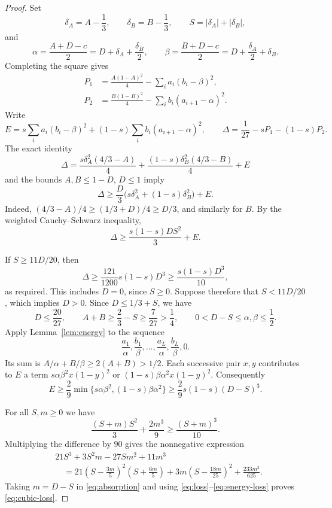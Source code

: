 \documentclass[11pt]{article}
\numberwithin{equation}{section}
\begin{document}
\begin{proof}
Set
\[
 \delta_A=A-\frac13,\qquad\delta_B=B-\frac13,
 \qquad S=|\delta_A|+|\delta_B|,
\]
and
\[
 \alpha=\frac{A+D-c}{2}=D+\delta_A+\frac{\delta_B}{2},
 \qquad
 \beta=\frac{B+D-c}{2}=D+\frac{\delta_A}{2}+\delta_B.
\]
Completing the square gives
\begin{align}
 P_1&=\frac{A(1-A)^2}{4}-\sum_i a_i(b_i-\beta)^2,
 \label{eq:square1}\\
 P_2&=\frac{B(1-B)^2}{4}-\sum_i b_i(a_{i+1}-\alpha)^2.
 \label{eq:square2}
\end{align}
Write
\[
 E=s\sum_i a_i(b_i-\beta)^2
 +(1-s)\sum_i b_i(a_{i+1}-\alpha)^2,
 \qquad
 \Delta=\frac1{27}-sP_1-(1-s)P_2.
\]
The exact identity
\[
 \Delta=\frac{s\delta_A^2(4/3-A)}4
 +\frac{(1-s)\delta_B^2(4/3-B)}4+E
\]
and the bounds \(A,B\le1-D\), \(D\le1\) imply
\[
 \Delta\ge\frac D3\bigl(s\delta_A^2+(1-s)\delta_B^2\bigr)+E.
\]
Indeed, \((4/3-A)/4\ge(1/3+D)/4\ge D/3\), and similarly for
\(B\). By the weighted Cauchy--Schwarz inequality,
\begin{equation}\label{eq:loss}
 \Delta\ge\frac{s(1-s)DS^2}{3}+E.
\end{equation}

If \(S\ge11D/20\), then
\[
 \Delta\ge\frac{121}{1200}s(1-s)D^3
 \ge\frac{s(1-s)D^3}{10},
\]
as required. This includes \(D=0\), since \(S\ge0\).
Suppose therefore that \(S<11D/20\), which implies \(D>0\). Since
\(D\le1/3+S\), we have
\[
 D\le\frac{20}{27},\qquad
 A+B\ge\frac23-S\ge\frac7{27}>\frac14,
 \qquad 0<D-S\le\alpha,\beta\le\frac12.
\]
Apply Lemma~\ref{lem:energy} to the sequence
\[
 \frac{a_1}{\alpha},\frac{b_1}{\beta},\ldots,
 \frac{a_L}{\alpha},\frac{b_L}{\beta},0.
\]
Its sum is \(A/\alpha+B/\beta\ge2(A+B)>1/2\).
Each successive pair \(x,y\) contributes to \(E\) a term
\(s\alpha\beta^2x(1-y)^2\) or
\((1-s)\beta\alpha^2x(1-y)^2\). Consequently
\begin{equation}\label{eq:energy-loss}
 E\ge\frac29\min\{s\alpha\beta^2,(1-s)\beta\alpha^2\}
 \ge\frac29s(1-s)(D-S)^3.
\end{equation}

For all \(S,m\ge0\) we have
\begin{equation}\label{eq:absorption}
 \frac{(S+m)S^2}{3}+\frac{2m^3}{9}\ge\frac{(S+m)^3}{10}.
\end{equation}
Multiplying the difference by \(90\) gives the nonnegative expression
\begin{align*}
 &21S^3+3S^2m-27Sm^2+11m^3\\
 &\quad=21\left(S-\frac{3m}{5}\right)^2\left(S+\frac{6m}{5}\right)
 +3m\left(S-\frac{18m}{25}\right)^2+\frac{233m^3}{625}.
\end{align*}
Taking \(m=D-S\) in \eqref{eq:absorption} and using
\eqref{eq:loss}--\eqref{eq:energy-loss} proves \eqref{eq:cubic-loss}.
\end{proof}
\end{document}

